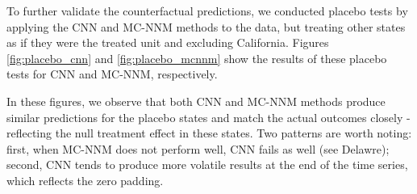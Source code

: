 To further validate the counterfactual predictions, we conducted placebo tests by applying the CNN and MC-NNM methods to the data, but treating other states as if they were the treated unit and excluding California.
Figures \ref{fig:placebo_cnn} and \ref{fig:placebo_mcnnm} show the results of these placebo tests for CNN and MC-NNM, respectively.


In these figures, we observe that both CNN and MC-NNM methods produce similar predictions for the placebo states and match the actual outcomes closely - reflecting the null treatment effect in these states.
Two patterns are worth noting: first, when MC-NNM does not perform well, CNN fails as well (see Delawre);
second, CNN tends to produce more volatile results at the end of the time series, which reflects the zero padding.
